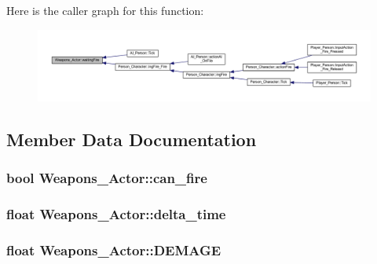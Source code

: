 Here is the caller graph for this function\+:\nopagebreak
\begin{figure}[H]
\begin{center}
\leavevmode
\includegraphics[width=350pt]{class_weapons___actor_aad412298d60d3ffd391c1e3b925eb206_icgraph}
\end{center}
\end{figure}




\subsection{Member Data Documentation}
\subsubsection[{\texorpdfstring{can\+\_\+fire}{can_fire}}]{\setlength{\rightskip}{0pt plus 5cm}bool Weapons\+\_\+\+Actor\+::can\+\_\+fire\hspace{0.3cm}{\ttfamily [private]}}\hypertarget{class_weapons___actor_a03094917a8513d50bf93da99b09b6295}{}\label{class_weapons___actor_a03094917a8513d50bf93da99b09b6295}
\subsubsection[{\texorpdfstring{delta\+\_\+time}{delta_time}}]{\setlength{\rightskip}{0pt plus 5cm}float Weapons\+\_\+\+Actor\+::delta\+\_\+time\hspace{0.3cm}{\ttfamily [private]}}\hypertarget{class_weapons___actor_a301ddf96a3148e09e550e355d36fbd02}{}\label{class_weapons___actor_a301ddf96a3148e09e550e355d36fbd02}
\subsubsection[{\texorpdfstring{D\+E\+M\+A\+GE}{DEMAGE}}]{\setlength{\rightskip}{0pt plus 5cm}float Weapons\+\_\+\+Actor\+::\+D\+E\+M\+A\+GE}\hypertarget{class_weapons___actor_aea43a4cdbf104cbb2a46112a14488bfd}{}\label{class_weapons___actor_aea43a4cdbf104cbb2a46112a14488bfd}
